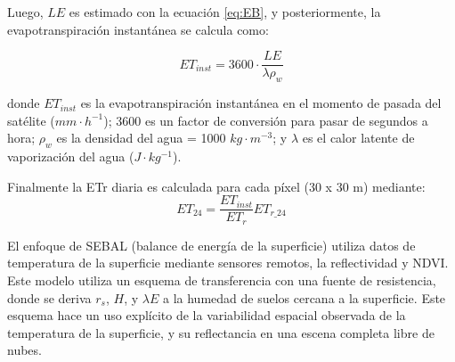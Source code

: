 \documentclass[]{article}
\begin{document}
Luego, $LE$ es estimado con la ecuación \ref{eq:EB}, y posteriormente, la evapotranspiración instantánea se calcula como:

\begin{equation}
ET_{inst} = 3600 \cdot \frac{LE}{\lambda \rho_w}
\end{equation}

donde $ET_{inst}$ es la evapotranspiración instantánea en el momento de pasada del satélite ($mm \cdot h^{-1}$); 3600 es un factor de conversión para pasar de segundos a hora; $\rho_w$ es la densidad del agua = 1000 $kg\cdot m^{-3}$; y $\lambda$ es el calor latente de vaporización del agua ($J\cdot kg^{-1}$).

Finalmente la ETr diaria es calculada para cada píxel (30 x 30 m) mediante:
\begin{equation}
ET_{24} = \frac{ET_{inst}}{ET_r} ET_{r\_24}
\label{eq:et24}
\end{equation}


El enfoque de SEBAL (balance de energía de la superficie) utiliza datos de temperatura de la superficie mediante sensores remotos, la reflectividad y NDVI. Este modelo utiliza un esquema de transferencia con una fuente de resistencia, donde se deriva $r_{s} $, $H$, y $\lambda E$ a la humedad de suelos cercana a la superficie. Este esquema hace un uso explícito de la variabilidad espacial observada de la temperatura de la superficie, y su reflectancia en una escena completa libre de nubes. 
\end{document}
